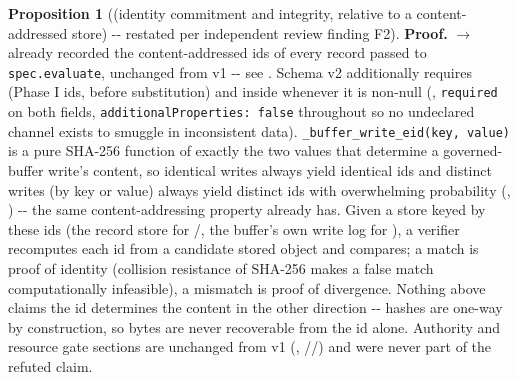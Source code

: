 \documentclass[11pt,a4paper]{article}
\theoremstyle{definition}
\newtheorem{proposition}{Proposition}
\begin{document}
\begin{proposition}[(identity commitment and integrity, relative to a content-addressed store) -{}- restated per independent review finding F2]
\noindent\textbf{Proof.}  $\to$  already recorded the content-addressed ids of every record passed to \texttt{spec.evaluate}, unchanged from v1 -{}- see . Schema v2 additionally requires  (Phase I ids, before substitution) and  inside  whenever it is non-null (, \texttt{required} on both fields, \texttt{additionalProperties: false} throughout so no undeclared channel exists to smuggle in inconsistent data). \texttt{\_buffer\_write\_eid(key, value)} is a pure SHA-256 function of exactly the two values that determine a governed-buffer write's content, so identical writes always yield identical ids and distinct writes (by key or value) always yield distinct ids with overwhelming probability (, ) -{}- the same content-addressing property  already has. Given a store keyed by these ids (the record store for /, the buffer's own write log for ), a verifier recomputes each id from a candidate stored object and compares; a match is proof of identity (collision resistance of SHA-256 makes a false match computationally infeasible), a mismatch is proof of divergence. Nothing above claims the id determines the content in the other direction -{}- hashes are one-way by construction, so bytes are never recoverable from the id alone. Authority and resource gate sections are unchanged from v1 (, //) and were never part of the refuted claim.


\end{proposition}
\end{document}

